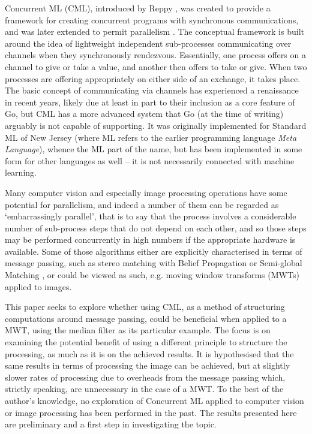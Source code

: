 Concurrent ML (CML), introduced by Reppy \cite{Reppy1991}, was created to provide a framework for creating concurrent programs with synchronous communications, and was later extended to permit parallelism \cite{Reppy2009a}.  The conceptual framework is built around the idea of lightweight independent sub-processes communicating over channels when they synchronously rendezvous.  Essentially, one process offers on a channel to give or take a value, and another then offers to take or give.  When two processes are offering appropriately on either side of an exchange, it takes place.  The basic concept of communicating via channels has experienced a renaissance in recent years, likely due at least in part to their inclusion as a core feature of Go, but CML has a more advanced system that Go (at the time of writing) arguably is not capable of supporting.  It was originally implemented for Standard ML of New Jersey (where ML refers to the earlier programming language \textit{Meta Language}), whence the ML part of the name, but has been implemented in some form for other languages as well -- it is not necessarily connected with machine learning.

Many computer vision and especially image processing operations have some potential for parallelism, and indeed a number of them can be regarded as `embarrassingly parallel', that is to say that the process involves a considerable number of sub-process steps that do not depend on each other, and so those steps may be performed concurrently in high numbers if the appropriate hardware is available.  Some of those algorithms either are explicitly characterised in terms of message passing, such as stereo matching with Belief Propagation \cite{Liang2011} or Semi-global Matching \cite{Drory2014}, or could be viewed as such, e.g. moving window transforms (MWTs) applied to images.

This paper seeks to explore whether using CML, as a method of structuring computations around message passing, could be beneficial when applied to a MWT, using the median filter as its particular example.  The focus is on examining the potential benefit of using a different principle to structure the processing, as much as it is on the achieved results.  It is hypothesised that the same results in terms of processing the image can be achieved, but at slightly slower rates of processing due to overheads from the message passing which, strictly speaking, are unnecessary in the case of a MWT. To the best of the author's knowledge, no exploration of Concurrent ML applied to computer vision or image processing has been performed in the past.  The results presented here are preliminary and a first step in investigating the topic.

